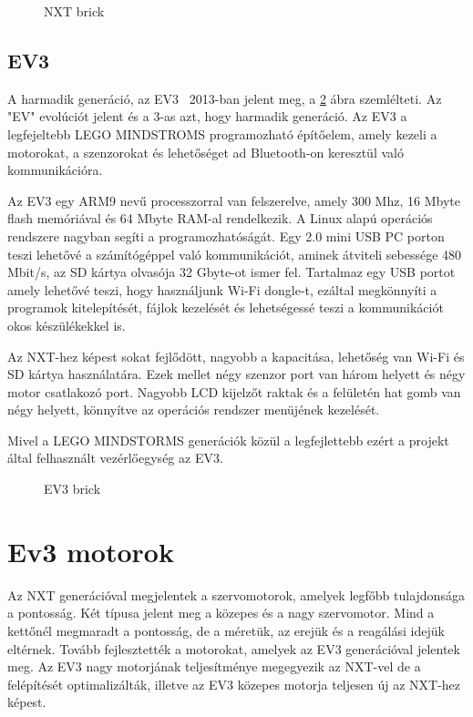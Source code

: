 \begin{figure}[!htb]
	\centering
	\caption{NXT brick}
	\label{fig:NXT}
\end{figure}

\subsection{EV3}

A harmadik generáció, az EV3~\cite{ev3Attribution}\cite{nxtVsEv3} 2013-ban jelent meg, a \ref{fig:EV3} ábra szemlélteti. Az "EV" evolúciót jelent és a 3-as azt, hogy harmadik generáció. Az EV3 a legfejeltebb LEGO MINDSTROMS programozható építőelem, amely kezeli a motorokat, a szenzorokat és lehetőséget ad Bluetooth-on keresztül való kommunikációra.

Az EV3 egy ARM9 nevű processzorral van felszerelve, amely 300 Mhz, 16 Mbyte flash memóriával és 64 Mbyte RAM-al rendelkezik. A Linux alapú operációs rendszere nagyban segíti a programozhatóságát. Egy 2.0 mini USB PC porton teszi lehetővé a számítógéppel való kommunikációt, aminek átviteli sebessége 480 Mbit/s, az SD kártya olvasója 32 Gbyte-ot ismer fel. Tartalmaz egy USB portot amely lehetővé teszi, hogy használjunk Wi-Fi dongle-t, ezáltal megkönnyíti a programok kitelepítését, fájlok kezelését és lehetségessé teszi a kommunikációt okos készülékekkel is.

Az NXT-hez képest sokat fejlődött, nagyobb a kapacitása, lehetőség van Wi-Fi és SD kártya használatára. Ezek mellet négy szenzor port van három helyett és négy motor csatlakozó port. Nagyobb LCD kijelzőt raktak és a felületén hat gomb van négy helyett, könnyítve az operációs rendszer menüjének kezelését.\cite{nxtVsEv3}

Mivel a LEGO MINDSTORMS generációk közül a legfejlettebb ezért a projekt által felhasznált vezérlőegység az EV3.

\begin{figure}[!htb]
	\centering
	\caption{EV3 brick}
	\label{fig:EV3}
\end{figure}


\section{Ev3 motorok}\label{sec:ROBOT:motorok}
Az NXT generációval megjelentek a szervomotorok, amelyek legfőbb tulajdonsága a pontosság. Két típusa jelent meg a közepes és a nagy szervomotor. Mind a kettőnél megmaradt a pontosság, de a méretük, az erejük és a reagálási idejük eltérnek. Tovább fejlesztették a motorokat, amelyek az EV3 generációval jelentek meg. Az EV3 nagy motorjának teljesítménye megegyezik az NXT-vel de a felépítését optimalizálták, illetve az EV3 közepes motorja teljesen új az NXT-hez képest.

